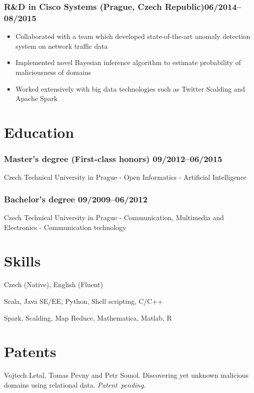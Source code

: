 \documentclass[10pt]{article}
\begin{document}
\subsubsection*{R\&D in Cisco Systems (Prague, Czech Republic)\hfill 06/2014--08/2015}
	 \begin{itemize}
		\setlength\itemsep{-0.25em}
		\item Collaborated with a team which developed state-of-the-art anomaly detection system on network traffic data
		\item Implemented novel Bayesian inference algorithm to estimate probability of maliciousness of domains
		\item Worked extensively with big data technologies such as Twitter Scalding and Apache Spark
	 \end{itemize}

\section*{Education}
\subsubsection*{\bf Master’s degree (First-class honors) \hfill 09/2012--06/2015}
\vspace{-1.5mm}
Czech Technical University in Prague - Open Informatics - Artificial Intelligence
\vspace{-1.5mm}
\subsubsection*{\bf Bachelor’s degree \hfill 09/2009--06/2012}
\vspace{-1.5mm}
Czech Technical University in Prague - Communication, Multimedia and Electronics - Communication technology

\section*{Skills}
\begin{description}
	\setlength\itemsep{0.05em}
	\item[Languages] Czech (Native), English (Fluent)
	\item[Programming]  Scala, Java SE/EE, Python, Shell scripting, C/C++
	\item[Analytics]  Spark, Scalding, Map Reduce, Mathematica, Matlab, R
\end{description}

\section*{Patents}
Vojtech Letal, Tomas Pevny and Petr Somol. Discovering yet unknown malicious domains using relational data. {\it Patent~pending.}
\end{document}

